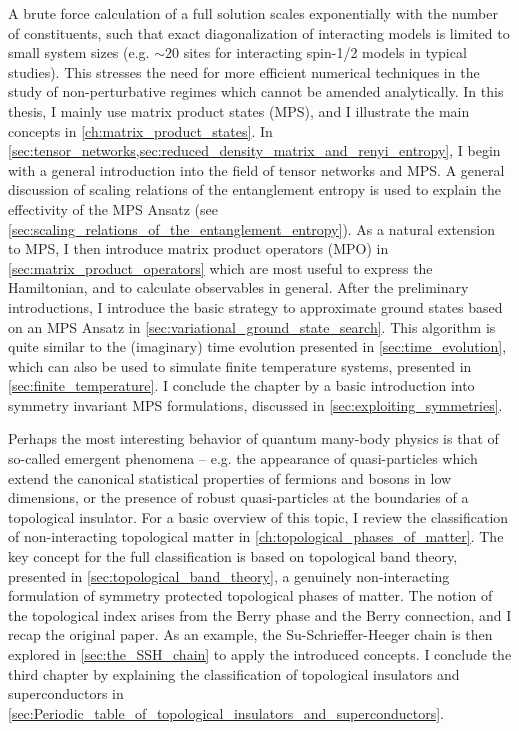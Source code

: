 A brute force calculation of a full solution scales exponentially with the number of constituents, such that exact diagonalization of interacting models is limited to small system sizes (e.g. $\sim 20$ sites for interacting spin-1/2 models in typical studies).
This stresses the need for more efficient numerical techniques in the study of non-perturbative regimes which cannot be amended analytically.
In this thesis, I mainly use matrix product states (MPS), and I illustrate the main concepts in \cref{ch:matrix_product_states}.
In \cref{sec:tensor_networks,sec:reduced_density_matrix_and_renyi_entropy}, I begin with a general introduction into the field of tensor networks and MPS.
A general discussion of scaling relations of the entanglement entropy is used to explain the effectivity of the MPS Ansatz (see \cref{sec:scaling_relations_of_the_entanglement_entropy}).
As a natural extension to MPS, I then introduce matrix product operators (MPO) in \cref{sec:matrix_product_operators} which are most useful to express the Hamiltonian, and to calculate observables in general.
After the preliminary introductions, I introduce the basic strategy to approximate ground states based on an MPS Ansatz in \cref{sec:variational_ground_state_search}.
This algorithm is quite similar to the (imaginary) time evolution presented in \cref{sec:time_evolution}, which can also be used to simulate finite temperature systems, presented in \cref{sec:finite_temperature}.
I conclude the chapter by a basic introduction into symmetry invariant MPS formulations, discussed in \cref{sec:exploiting_symmetries}.

Perhaps the most interesting behavior of quantum many-body physics is that of so-called emergent phenomena -- e.g. the appearance of quasi-particles which extend the canonical statistical properties of fermions and bosons in low dimensions, or the presence of robust quasi-particles at the boundaries of a topological insulator.
For a basic overview of this topic, I review the classification of non-interacting topological matter in \cref{ch:topological_phases_of_matter}.
The key concept for the full classification is based on topological band theory, presented in \cref{sec:topological_band_theory}, a genuinely non-interacting formulation of symmetry protected topological phases of matter.
The notion of the topological index arises from the Berry phase and the Berry connection, and I recap the original paper.
As an example, the Su-Schrieffer-Heeger chain is then explored in \cref{sec:the_SSH_chain} to apply the introduced concepts.
I conclude the third chapter by explaining the classification of topological insulators and superconductors in \cref{sec:Periodic_table_of_topological_insulators_and_superconductors}.


